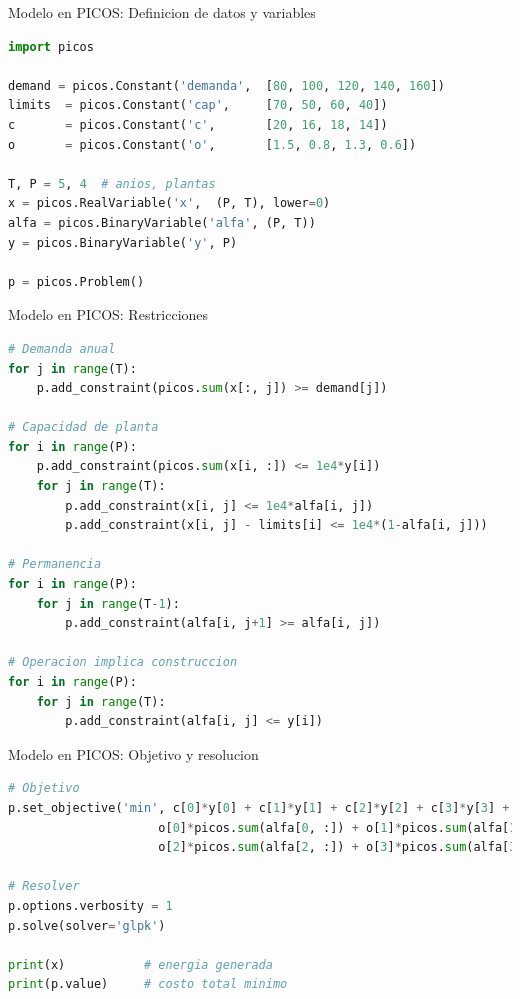 \documentclass{beamer}
\begin{document}
\begin{frame}[fragile]{Modelo en PICOS: Definicion de datos y variables}
    \begin{lstlisting}[language=Python]
import picos

demand = picos.Constant('demanda',  [80, 100, 120, 140, 160])
limits  = picos.Constant('cap',     [70, 50, 60, 40])
c       = picos.Constant('c',       [20, 16, 18, 14])
o       = picos.Constant('o',       [1.5, 0.8, 1.3, 0.6])

T, P = 5, 4  # anios, plantas
x = picos.RealVariable('x',  (P, T), lower=0)
alfa = picos.BinaryVariable('alfa', (P, T))
y = picos.BinaryVariable('y', P)

p = picos.Problem()
    \end{lstlisting}
\end{frame}

\begin{frame}[fragile]{Modelo en PICOS: Restricciones}
    \begin{lstlisting}[language=Python]
# Demanda anual
for j in range(T):
    p.add_constraint(picos.sum(x[:, j]) >= demand[j])

# Capacidad de planta
for i in range(P):
    p.add_constraint(picos.sum(x[i, :]) <= 1e4*y[i])
    for j in range(T):
        p.add_constraint(x[i, j] <= 1e4*alfa[i, j])
        p.add_constraint(x[i, j] - limits[i] <= 1e4*(1-alfa[i, j]))

# Permanencia
for i in range(P):
    for j in range(T-1):
        p.add_constraint(alfa[i, j+1] >= alfa[i, j])

# Operacion implica construccion
for i in range(P):
    for j in range(T):
        p.add_constraint(alfa[i, j] <= y[i])
    \end{lstlisting}
\end{frame}

\begin{frame}[fragile]{Modelo en PICOS: Objetivo y resolucion}
    \begin{lstlisting}[language=Python]
# Objetivo
p.set_objective('min', c[0]*y[0] + c[1]*y[1] + c[2]*y[2] + c[3]*y[3] +
                     o[0]*picos.sum(alfa[0, :]) + o[1]*picos.sum(alfa[1, :]) +
                     o[2]*picos.sum(alfa[2, :]) + o[3]*picos.sum(alfa[3, :]))

# Resolver
p.options.verbosity = 1
p.solve(solver='glpk')

print(x)           # energia generada
print(p.value)     # costo total minimo
    \end{lstlisting}
\end{frame}
\end{document}
